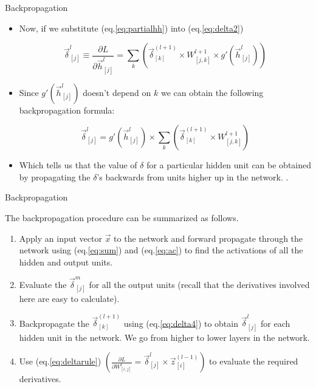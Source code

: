 \documentclass[handout]{beamer}
\begin{document}
\begin{frame}{Backpropagation}
\begin{scriptsize}

\begin{itemize}
\item Now, if we substitute (eq.\ref{eq:partialhh}) into (eq.\ref{eq:delta2})


 \begin{equation}
\vec{\delta}_{[j]}^l \equiv \frac{\partial L}{\partial \vec{h}_{[j]}^l} = \sum_{k} \left( \vec{\delta}_{[k]}^{(l+1)}  \times W_{[j,k]}^{l+1} \times g'(\vec{h}_{[j]}^{l}) \right)
\label{eq:delta3}
\end{equation}

\item Since $g'(\vec{h}_{[j]}^{l})$ doesn't depend on $k$ we can obtain the following backpropagation formula:

 \begin{equation}
\vec{\delta}_{[j]}^l = g'(\vec{h}_{[j]}^{l}) \times \sum_{k} \left( \vec{\delta}_{[k]}^{(l+1)}  \times W_{[j,k]}^{l+1}\right)  
\label{eq:delta4}
\end{equation}

\item Which tells us that the value of $\delta$ for a particular hidden unit can be obtained by propagating the $\delta$'s backwards from units higher up in the network. \cite{bishop2006pattern}.

\end{itemize}

\end{scriptsize}
\end{frame}



\begin{frame}{Backpropagation }
\begin{scriptsize}
The backpropagation procedure can  be summarized as follows.
\begin{enumerate}
 \item Apply an input vector $\vec{x}$  to the network and forward propagate through
the network using (eq.\ref{eq:sum}) and (eq.\ref{eq:ac}) to find the activations of all the hidden and output units.
\item Evaluate the $\vec{\delta}_{[j]}^m$ for all the output units (recall that the derivatives involved here are easy to calculate).
\item Backpropagate the $\vec{\delta}_{[k]}^{(l+1)}$ using (eq.\ref{eq:delta4}) to obtain $\vec{\delta}_{[j]}^l$ for each hidden unit in the network. We go from higher to lower layers in the network.
\item Use (eq.\ref{eq:deltarule}) $(\frac{\partial L}{\partial W_{[i,j]}^l} = \vec{\delta}_{[j]}^l \times \vec{z}_{[i]}^{(l-1)})$ to evaluate the required derivatives.
\end{enumerate}


\end{scriptsize}
\end{frame}
\end{document}
